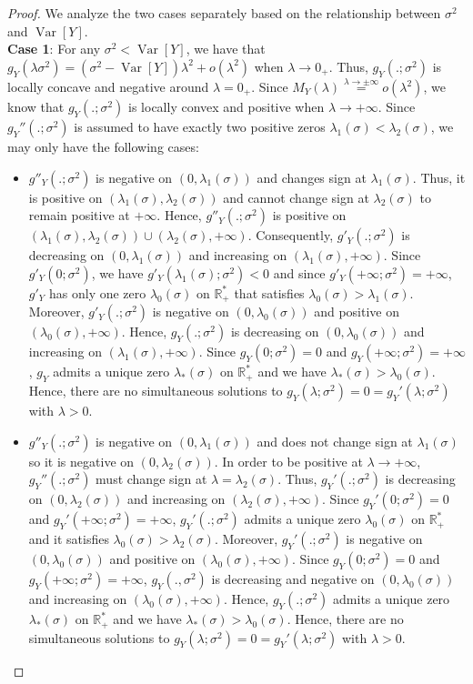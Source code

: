 \documentclass[a4paper, 10pt]{article}
\theoremstyle{definition}
\begin{document}
\begin{proof}
We analyze the two cases separately based on the relationship between $\sigma^2$ and $\operatorname{Var}[Y]$.\\
\textbf{Case 1}: For any $\sigma^2<\operatorname{Var}[Y]$, we have that $g_Y(\lambda\sigma^2)=(\sigma^2-\operatorname{Var}[Y])\lambda^2+o(\lambda^2)$ when $\lambda\to 0_+$. Thus, $g_Y(.;\sigma^2)$ is locally concave and negative around $\lambda=0_+$. Since  $M_Y(\lambda)\overset{\lambda\to \pm\infty}{=}o(\lambda^2)$, we know that $g_Y(.;\sigma^2)$ is locally convex and positive when $\lambda\to +\infty$. Since $g_Y''(.;\sigma^2)$ is assumed to have exactly two positive zeros $\lambda_1(\sigma)<\lambda_2(\sigma)$, we may only have the following cases:
\begin{itemize}
    \item $g''_Y(.;\sigma^2)$ is negative on $(0,\lambda_1(\sigma))$ and changes sign at $\lambda_1(\sigma)$. Thus, it is positive on $(\lambda_1(\sigma),\lambda_2(\sigma))$ and cannot change sign at $\lambda_2(\sigma)$ to remain positive at $+\infty$. Hence, $g''_Y(.;\sigma^2)$ is positive on $(\lambda_1(\sigma),\lambda_2(\sigma))\cup (\lambda_2(\sigma),+\infty)$. Consequently, $g'_Y(.;\sigma^2)$ is decreasing on $(0,\lambda_1(\sigma))$ and increasing on $(\lambda_1(\sigma),+\infty)$. Since $g'_Y(0;\sigma^2)$, we have $g'_Y(\lambda_1(\sigma);\sigma^2)<0$ and since $g'_Y(+\infty;\sigma^2)=+\infty$, $g'_Y$ has only one zero $\lambda_0(\sigma)$ on $\mathbb{R}_+^*$ that satisfies $\lambda_0(\sigma)>\lambda_1(\sigma)$. Moreover, $g'_Y(.;\sigma^2)$ is negative on $(0,\lambda_0(\sigma))$ and positive on $(\lambda_0(\sigma),+\infty)$. Hence, $g_Y(.;\sigma^2)$ is decreasing on $(0,\lambda_0(\sigma))$ and increasing on $(\lambda_1(\sigma),+\infty)$. Since $g_Y(0;\sigma^2)=0$ and $g_Y(+\infty;\sigma^2)=+\infty$, $g_Y$ admits a unique zero $\lambda_*(\sigma)$ on $\mathbb{R}_+^*$ and we have $\lambda_*(\sigma)>\lambda_0(\sigma)$. Hence, there are no simultaneous solutions to $g_Y(\lambda;\sigma^2)=0=g_Y'(\lambda;\sigma^2)$ with $\lambda>0$.
    \item $g''_Y(.;\sigma^2)$ is negative on $(0,\lambda_1(\sigma))$ and does not change sign at $\lambda_1(\sigma)$ so it is negative on $(0,\lambda_2(\sigma))$. In order to be positive at $\lambda\to +\infty$, $g_Y''(.;\sigma^2)$ must change sign at $\lambda=\lambda_2(\sigma)$. Thus, $g_Y'(.;\sigma^2)$ is decreasing on $(0,\lambda_2(\sigma))$ and increasing on $(\lambda_2(\sigma),+\infty)$. Since $g_Y'(0;\sigma^2)=0$ and $g_Y'(+\infty;\sigma^2)=+\infty$, $g_Y'(.;\sigma^2)$ admits a unique zero $\lambda_0(\sigma)$ on $\mathbb{R}_+^*$ and it satisfies $\lambda_0(\sigma)>\lambda_2(\sigma)$. Moreover, $g_Y'(.;\sigma^2)$ is negative on $(0,\lambda_0(\sigma))$ and positive on $(\lambda_0(\sigma),+\infty)$. Since $g_Y(0;\sigma^2)=0$ and $g_Y(+\infty;\sigma^2)=+\infty$, $g_Y(.,\sigma^2)$ is decreasing and negative on $(0,\lambda_0(\sigma))$ and increasing on $(\lambda_0(\sigma),+\infty)$. Hence, $g_Y(.;\sigma^2)$ admits a unique zero $\lambda_*(\sigma)$ on $\mathbb{R}_+^*$ and we have $\lambda_*(\sigma)>\lambda_0(\sigma)$. Hence, there are no simultaneous solutions to $g_Y(\lambda;\sigma^2)=0=g_Y'(\lambda;\sigma^2)$ with $\lambda>0$.

\end{itemize}
\end{proof}
\end{document}
